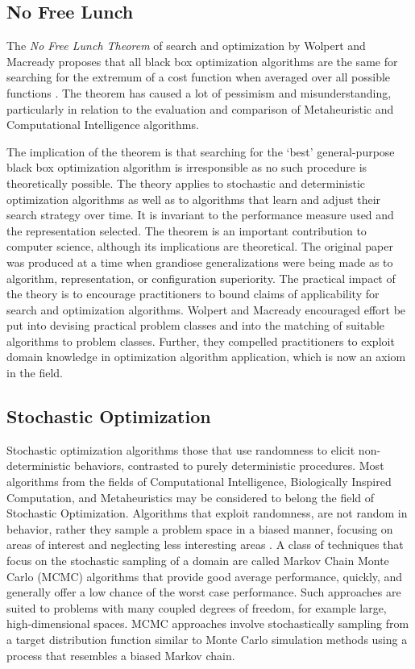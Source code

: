 \begin{bibunit}
% 
% 
\subsection{No Free Lunch}
\label{subsec:nfl}
The \emph{No Free Lunch Theorem} of search and optimization by Wolpert and Macready proposes that all black box optimization algorithms are the same for searching for the extremum of a cost function when averaged over all possible functions \cite{Wolpert1997, Wolpert1995}. The theorem has caused a lot of pessimism and misunderstanding, particularly in relation to the evaluation and comparison of Metaheuristic and Computational Intelligence algorithms.

The implication of the theorem is that searching for the `best' general-purpose black box optimization algorithm is irresponsible as no such procedure is theoretically possible. The theory applies to stochastic and deterministic optimization algorithms as well as to algorithms that learn and adjust their search strategy over time. It is invariant to the performance measure used and the representation selected. 
The theorem is an important contribution to computer science, although its implications are theoretical. The original paper was produced at a time when grandiose generalizations were being made as to algorithm, representation, or configuration superiority. The practical impact of the theory is to encourage practitioners to bound claims of applicability for search and optimization algorithms. Wolpert and Macready encouraged effort be put into devising practical problem classes and into the matching of suitable algorithms to problem classes. Further, they compelled practitioners to exploit domain knowledge in optimization algorithm application, which is now an axiom in the field.

% 
% 
\subsection{Stochastic Optimization}
\label{subsec:stochastic}
Stochastic optimization algorithms those that use randomness to elicit non-deterministic behaviors, contrasted to purely deterministic procedures. 
Most algorithms from the fields of Computational Intelligence, Biologically Inspired Computation, and Metaheuristics may be considered to belong the field of Stochastic Optimization. Algorithms that exploit randomness, are not random in behavior, rather they sample a problem space in a biased manner, focusing on areas of interest and neglecting less interesting areas \cite{Spall2003}. 
A class of techniques that focus on the stochastic sampling of a domain are called Markov Chain Monte Carlo (MCMC) algorithms that provide good average performance, quickly, and generally offer a low chance of the worst case performance. Such approaches are suited to problems with many coupled degrees of freedom, for example large, high-dimensional spaces. MCMC approaches involve stochastically sampling from a target distribution function similar to Monte Carlo simulation methods using a process that resembles a biased Markov chain.


\end{bibunit}

